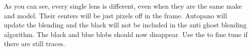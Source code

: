 \begin{fullwidth}

As you can see, every single lens is different, even when they are the same make and model. Their centers will be just pixels off in the frame. Autopano will update the blending and the black will not be included in the anti ghost blending algorithm. The black and blue blobs should now disappear. Use the \textbf{} to fine tune if there are still traces.

\clearpage
\end{fullwidth}
